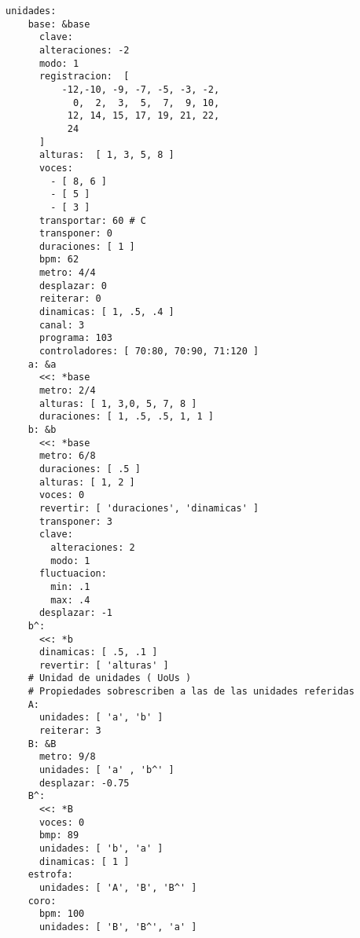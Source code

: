 \begin{itemize}
\begin{verbatim}
unidades:
    base: &base 
      clave:
      alteraciones: -2
      modo: 1
      registracion:  [ 
          -12,-10, -9, -7, -5, -3, -2,
            0,  2,  3,  5,  7,  9, 10,
           12, 14, 15, 17, 19, 21, 22,
           24
      ]
      alturas:  [ 1, 3, 5, 8 ] 
      voces: 
        - [ 8, 6 ] 
        - [ 5 ] 
        - [ 3 ]
      transportar: 60 # C
      transponer: 0
      duraciones: [ 1 ]
      bpm: 62
      metro: 4/4
      desplazar: 0
      reiterar: 0
      dinamicas: [ 1, .5, .4 ]
      canal: 3
      programa: 103
      controladores: [ 70:80, 70:90, 71:120 ]
    a: &a 
      <<: *base
      metro: 2/4
      alturas: [ 1, 3,0, 5, 7, 8 ]
      duraciones: [ 1, .5, .5, 1, 1 ]
    b: &b 
      <<: *base
      metro: 6/8
      duraciones: [ .5 ]
      alturas: [ 1, 2 ]
      voces: 0
      revertir: [ 'duraciones', 'dinamicas' ]
      transponer: 3
      clave: 
        alteraciones: 2
        modo: 1 
      fluctuacion: 
        min: .1
        max: .4 
      desplazar: -1
    b^: 
      <<: *b
      dinamicas: [ .5, .1 ]
      revertir: [ 'alturas' ]
    # Unidad de unidades ( UoUs )
    # Propiedades sobrescriben a las de las unidades referidas 
    A: 
      unidades: [ 'a', 'b' ] 
      reiterar: 3
    B: &B 
      metro: 9/8
      unidades: [ 'a' , 'b^' ]
      desplazar: -0.75
    B^: 
      <<: *B
      voces: 0 
      bmp: 89
      unidades: [ 'b', 'a' ] 
      dinamicas: [ 1 ]
    estrofa: 
      unidades: [ 'A', 'B', 'B^' ]
    coro: 
      bpm: 100
      unidades: [ 'B', 'B^', 'a' ]

\end{verbatim}


\end{itemize}
\setlength{\parskip}{6pt plus 2pt minus 1pt}